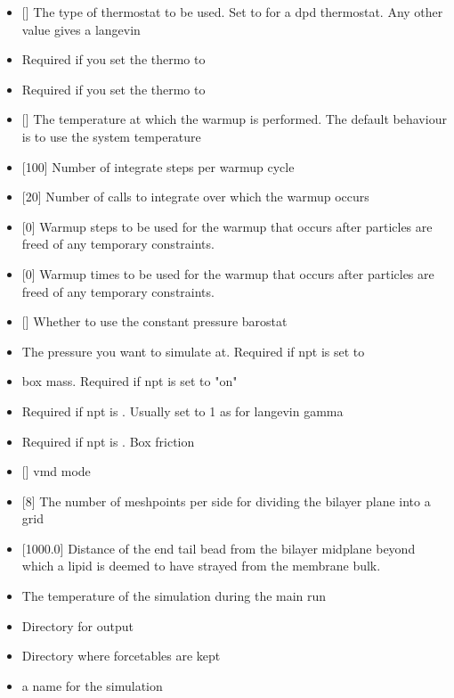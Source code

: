 \begin{itemize}
\item {} [] The type of thermostat to be
  used. Set to  for a dpd thermostat. Any other value gives a
  langevin
\item {} Required if you set the thermo to 
\item {} Required if you set the thermo to 
\item {} [] The temperature at which
  the warmup is performed. The default behaviour is to use the system
  temperature
\item {} [100] Number of integrate steps per warmup cycle
\item {} [20] Number of calls to integrate over which the
  warmup occurs
\item {} [0] Warmup steps to be used for the warmup
  that occurs after particles are freed of any temporary constraints.
\item {} [0] Warmup times to be used for the warmup
  that occurs after particles are freed of any temporary constraints.
\item {} [] Whether to use the constant pressure
  barostat
\item {} The pressure you want to simulate at. Required if
  npt is set to 
\item {} box mass. Required if npt is set to "on"
\item {} Required if npt is . Usually set to 1 as
  for langevin gamma
\item {} Required if npt is . Box friction
\item {} [] vmd mode
\item {} [8] The number of meshpoints per side for dividing
  the bilayer plane into a grid
\item {} [1000.0] Distance of the end tail bead
  from the bilayer midplane beyond which a lipid is deemed to have
  strayed from the membrane bulk.
\item {} The temperature of the simulation during the
  main run
\item {} Directory for output
\item {} Directory where forcetables are kept
\item {} a name for the simulation

\end{itemize}
